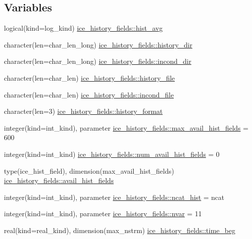 \subsection*{Variables}
\begin{DoxyCompactItemize}
\item 
logical(kind=log\_\-kind) \hyperlink{namespaceice__history__fields_ad443ef4b2750dd319f461697e217bec3}{ice\_\-history\_\-fields::hist\_\-avg}
\item 
character(len=char\_\-len\_\-long) \hyperlink{namespaceice__history__fields_ad01cae93d8dc2047429cb0e05167039d}{ice\_\-history\_\-fields::history\_\-dir}
\item 
character(len=char\_\-len\_\-long) \hyperlink{namespaceice__history__fields_a657cfadfafd4d1cc6407ddcd83a7c868}{ice\_\-history\_\-fields::incond\_\-dir}
\item 
character(len=char\_\-len) \hyperlink{namespaceice__history__fields_a9c351e060cb10822d8e53ef2ebfaa0fa}{ice\_\-history\_\-fields::history\_\-file}
\item 
character(len=char\_\-len) \hyperlink{namespaceice__history__fields_aafbbbc135005a06804884fb2cca8d494}{ice\_\-history\_\-fields::incond\_\-file}
\item 
character(len=3) \hyperlink{namespaceice__history__fields_a1f38b0cd52722e7ed80947313d84936a}{ice\_\-history\_\-fields::history\_\-format}
\item 
integer(kind=int\_\-kind), parameter \hyperlink{namespaceice__history__fields_abce9e6fec5b792ea13bd34332a858f16}{ice\_\-history\_\-fields::max\_\-avail\_\-hist\_\-fields} = 600
\item 
integer(kind=int\_\-kind) \hyperlink{namespaceice__history__fields_ae792c3e29c3220a23344fc57f0950944}{ice\_\-history\_\-fields::num\_\-avail\_\-hist\_\-fields} = 0
\item 
type(ice\_\-hist\_\-field), dimension(max\_\-avail\_\-hist\_\-fields) \hyperlink{namespaceice__history__fields_a9614b7f86e2f876b54ea179e0bd10b13}{ice\_\-history\_\-fields::avail\_\-hist\_\-fields}
\item 
integer(kind=int\_\-kind), parameter \hyperlink{namespaceice__history__fields_ad4675933f882f223e8ec25c5c938b13e}{ice\_\-history\_\-fields::ncat\_\-hist} = ncat
\item 
integer(kind=int\_\-kind), parameter \hyperlink{namespaceice__history__fields_a36bf5fe8de5bdf3f0fa9bd6840536a96}{ice\_\-history\_\-fields::nvar} = 11
\item 
real(kind=real\_\-kind), dimension(max\_\-nstrm) \hyperlink{namespaceice__history__fields_af6acdcd2aad4d4b1e7de1048a0654b1b}{ice\_\-history\_\-fields::time\_\-beg}

\end{DoxyCompactItemize}
